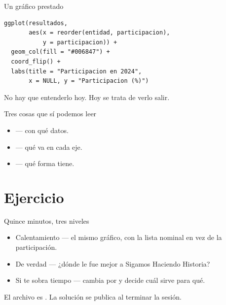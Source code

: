 \begin{frame}[fragile]{Un gráfico prestado}
\begin{lstlisting}
ggplot(resultados,
       aes(x = reorder(entidad, participacion),
           y = participacion)) +
  geom_col(fill = "#006847") +
  coord_flip() +
  labs(title = "Participacion en 2024",
       x = NULL, y = "Participacion (%)")
\end{lstlisting}

  \vspace{0.5em}
  {\small No hay que entenderlo hoy. Hoy se trata de verlo salir.}
\end{frame}

\begin{frame}{Tres cosas que sí podemos leer}
  \vspace{0.4em}
  \begin{itemize}\setlength{\itemsep}{0.9em}
    \item<1->  — con qué datos.
    \item<2->  — qué va en cada eje.
    \item<3->  — qué forma tiene.
  \end{itemize}

  \vspace{1.2em}
\end{frame}

\section{Ejercicio}

\begin{frame}{Quince minutos, tres niveles}
  \vspace{0.4em}
  \begin{itemize}\setlength{\itemsep}{1.0em}
    \item \ac{Calentamiento} — el mismo gráfico, con la lista nominal en
          vez de la participación.
    \item \ac{De verdad} — ¿dónde le fue mejor a Sigamos Haciendo Historia?
    \item \ac{Si te sobra tiempo} — cambia  por
           y decide cuál sirve para qué.
  \end{itemize}

  \vspace{1.2em}
  {\small\color{grisTenue}El archivo es . La solución
  se publica al terminar la sesión.}
\end{frame}

